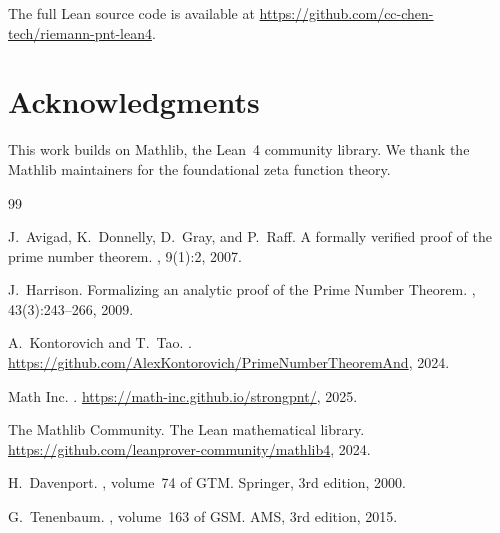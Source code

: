 \documentclass[11pt,a4paper]{article}
\theoremstyle{remark}
\begin{document}
The full Lean source code is available at
\url{https://github.com/cc-chen-tech/riemann-pnt-lean4}.

\section*{Acknowledgments}
This work builds on Mathlib, the Lean~4 community library. We thank the
Mathlib maintainers for the foundational zeta function theory.


\begin{thebibliography}{99}

J.~Avigad, K.~Donnelly, D.~Gray, and P.~Raff.
\newblock A formally verified proof of the prime number theorem.
, 9(1):2, 2007.

J.~Harrison.
\newblock Formalizing an analytic proof of the Prime Number Theorem.
, 43(3):243--266, 2009.

A.~Kontorovich and T.~Tao.
.
\newblock \url{https://github.com/AlexKontorovich/PrimeNumberTheoremAnd}, 2024.

Math Inc.
.
\newblock \url{https://math-inc.github.io/strongpnt/}, 2025.

The Mathlib Community.
\newblock The Lean mathematical library.
\newblock \url{https://github.com/leanprover-community/mathlib4}, 2024.

H.~Davenport.
, volume~74 of GTM.
\newblock Springer, 3rd edition, 2000.

G.~Tenenbaum.
,
  volume~163 of GSM.
\newblock AMS, 3rd edition, 2015.

\end{thebibliography}
\end{document}
